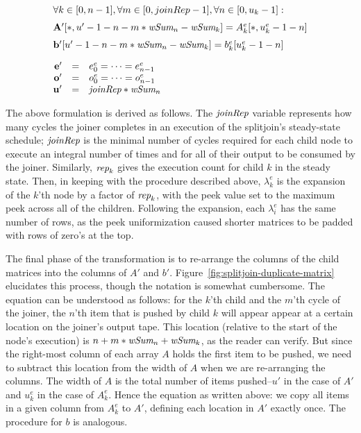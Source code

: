 \begin{transformation}
\begin{equation}
\begin{array}{rcl}
\multicolumn{3}{l}{\forall k \in [0, n-1], \forall m \in [0, joinRep-1], \forall n \in [0, u_k-1]:} \\ ~ \vspace{-6pt} \\
\multicolumn{3}{l}{\mathbf{A'}[*, u'-1-n - m * \mt{wSum}_{n}-\mt{wSum}_{k}] = 
  A_{k}^e [*,u_k^e-1-n]} \\ ~ \vspace{-6pt} \\
\multicolumn{3}{l}{\mathbf{b'}[u'-1-n - m * \mt{wSum}_{n}-\mt{wSum}_{k}] = 
  b_{k}^e [u_k^e-1-n]} \\ ~ \vspace{-2pt} \\
\mathbf{e'} & = & e_0^e = \dots = e_{n-1}^e \\
\mathbf{o'} & = & o_0^e = \dots = o_{n-1}^e \\
\mathbf{u'} & = & \mt{joinRep} * \mt{wSum}_n \\
\end{array}
\end{equation}
\end{transformation}

The above formulation is derived as follows.  The $\mbox{\it joinRep}$
variable represents how many cycles the joiner completes in an
execution of the splitjoin's steady-state schedule; $\mbox{\it joinRep}$ is
the minimal number of cycles required for each child node to execute
an integral number of times and for all of their output to be consumed
by the joiner.  Similarly, $\mbox{\it rep}_k$ gives the execution count for
child $k$ in the steady state.  Then, in keeping with the procedure
described above, $\lambda_k^e$ is the expansion of the $k$'th node by
a factor of $\mbox{\it rep}_k$, with the peek value set to the maximum peek
across all of the children.  Following the expansion, each
$\lambda_i^e$ has the same number of rows, as the peek uniformization
caused shorter matrices to be padded with rows of zero's at the top.

The final phase of the transformation is to re-arrange the columns of
the child matrices into the columns of $A'$ and $b'$.
Figure~\ref{fig:splitjoin-duplicate-matrix} elucidates this process,
though the notation is somewhat cumbersome.  The equation can be
understood as follows: for the $k$'th child and the $m$'th cycle of
the joiner, the $n$'th item that is pushed by child $k$ will appear
appear at a certain location on the joiner's output tape.  This
location (relative to the start of the node's execution) is $n + m *
\mbox{\it wSum}_n + \mbox{\it wSum}_k$, as the reader can verify.  But since the
right-most column of each array $A$ holds the first item to be pushed,
we need to subtract this location from the width of $A$ when we are
re-arranging the columns.  The width of $A$ is the total number of
items pushed--$u'$ in the case of $A'$ and $u_k^e$ in the case of
$A_k^e$.  Hence the equation as written above: we copy all items in a
given column from $A_k^e$ to $A'$, defining each location in $A'$
exactly once.  The procedure for $b$ is analogous.

